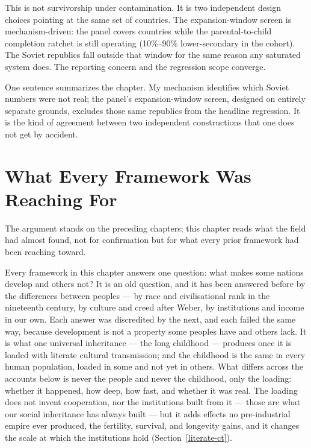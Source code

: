 \documentclass[12pt,letterpaper]{article}
\begin{document}
This is not survivorship under contamination. It is two independent
design choices pointing at the same set of countries. The
expansion-window screen is mechanism-driven: the panel covers
countries while the parental-to-child completion ratchet is still
operating (10\%--90\% lower-secondary in the cohort). The Soviet
republics fall outside that window for the same reason any saturated
system does. The reporting concern and the regression scope converge.

One sentence summarizes the chapter. My mechanism identifies which
Soviet numbers were not real; the panel's expansion-window screen,
designed on entirely separate grounds, excludes those same republics
from the headline regression. It is the kind of agreement between
two independent constructions that one does not get by accident.

\section{What Every Framework Was Reaching For}\label{what-every-framework-was-reaching-for}

%


The argument stands on the preceding chapters; this chapter reads what the field had almost found, not for confirmation but for what every prior framework had been reaching toward.

Every framework in this chapter answers one question: what makes some nations develop and others not? It is an old question, and it has been answered before by the differences between peoples --- by race and civilisational rank in the nineteenth century, by culture and creed after Weber, by institutions and income in our own. Each answer was discredited by the next, and each failed the same way, because development is not a property some peoples have and others lack. It is what one universal inheritance --- the long childhood --- produces once it is loaded with literate cultural transmission; and the childhood is the same in every human population, loaded in some and not yet in others. What differs across the accounts below is never the people and never the childhood, only the loading: whether it happened, how deep, how fast, and whether it was real. The loading does not invent cooperation, nor the institutions built from it --- those are what our social inheritance has always built --- but it adds effects no pre-industrial empire ever produced, the fertility, survival, and longevity gains, and it changes the scale at which the institutions hold (Section~\ref{literate-ct}).
\end{document}
